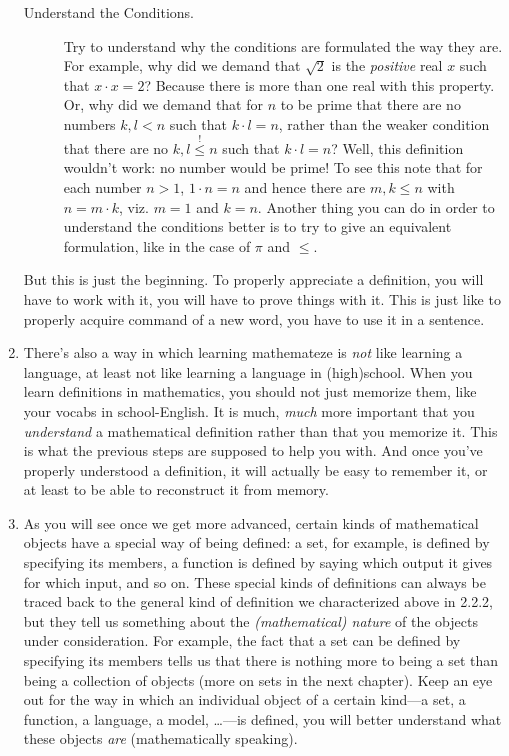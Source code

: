 \begin{enumerate}[{\thesection}.1]
\begin{description}
			\item[Understand the Conditions.] Try to understand why the conditions are formulated the way they are. For example, why did we demand that $\sqrt{2}$ is the \emph{positive} real $x$ such that $x\cdot x=2$? Because there is more than one real with this property. Or, why did we demand that for $n$ to be prime that there are no numbers $k,l<n$ such that $k\cdot l=n$, rather than the weaker condition that there are no $k,l\overset{!}{\leq} n$ such that $k\cdot l=n$? Well, this definition wouldn't work: no number would be prime! To see this note that for each number $n>1$, $1\cdot n=n$ and hence there are $m,k\leq n$ with $n=m\cdot k$, viz. $m=1$ and $k=n$. Another thing you can do in order to understand the conditions better is to try to give an equivalent formulation, like in the case of $\pi$ and $\leq$. 
		
		\end{description}
		
		But this is just the beginning. To properly appreciate a definition, you will have to work with it, you will have to prove things with it. This is just like to properly acquire command of a new word, you have to use it in a sentence. 
		
		\item There's also a way in which learning mathemateze is \emph{not} like learning a language, at least not like learning a language in (high)school. When you learn definitions in mathematics, you should not just memorize them, like your vocabs in school-English. It is much, \emph{much} more important that you \emph{understand} a mathematical definition rather than that you memorize it. This is what the previous steps are supposed to help you with. And once you've properly understood a definition, it will actually be easy to remember it, or at least to be able to reconstruct it from memory.
		
		\item As you will see once we get more advanced, certain kinds of mathematical objects have a special way of being defined: a set, for example, is defined by specifying its members, a function is defined by saying which output it gives for which input, and so on. These special kinds of definitions can always be traced back to the general kind of definition we characterized above in 2.2.2, but they tell us something about the \emph{(mathematical) nature} of the objects under consideration. For example, the fact that a set can be defined by specifying its members tells us that there is nothing more to being a set than being a collection of objects (more on sets in the next chapter). Keep an eye out for the way in which an individual object of a certain kind---a set, a function, a language, a model, \dots---is defined, you will better understand what these objects \emph{are} (mathematically speaking).
		

\end{enumerate}
